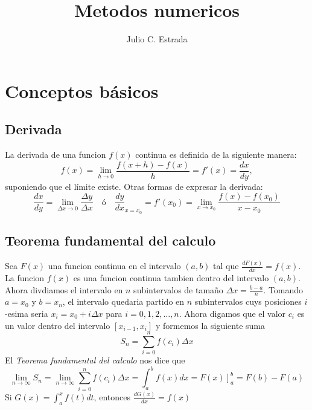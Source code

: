 \documentclass{article}
\title{Metodos numericos}
\author{Julio C. Estrada}
\begin{document}
\maketitle

\section{Conceptos b\'asicos}
\subsection{Derivada}
La derivada de una funcion $f(x)$ continua es definida de la siguiente
manera:
\begin{equation}
  f(x)=\lim_{h\to 0}\frac{f(x+h)-f(x)}{h}=f'(x)=\frac{dx}{dy},
\end{equation}
suponiendo que el l\'imite existe. Otras formas de expresar la
derivada:
\begin{equation}
  \frac{dx}{dy}=\lim_{\Delta x\to 0}\frac{\Delta y}{\Delta x}\quad
  \text{\'o}
  \quad \frac{dy}{dx}_{x=x_0}=f'(x_0)=\lim_{x\to x_0}\frac{f(x)-f(x_0)}{x-x_0}
\end{equation}

\subsection{Teorema fundamental del calculo}
Sea $F(x)$ una funcion continua en el intervalo $(a,b)$ tal que
$\frac{dF(x)}{dx}=f(x)$. La funcion $f(x)$ es una funcion continua
tambien dentro del intervalo $(a,b)$. Ahora divdiamos el intervalo en
$n$ subintervalos de tama\~no $\Delta x=\frac{b-a}{n}$. Tomando
$a=x_0$ y $b=x_n$, el intervalo quedaria partido en $n$ subintervalos
cuys posiciones $i$-esima seria $x_i=x_0+i\Delta x$ para
$i=0,1,2,\dots,n$. Ahora digamos que el valor $c_i$ es un valor dentro
del intervalo $[x_{i-1},x_i]$ y formemos la siguiente suma
\begin{equation}
  S_n=\sum_{i=0}^{n}f(c_i)\Delta x
\end{equation}
El \emph{Teorema fundamental del calculo} nos dice que
\begin{equation}
\lim_{n\to \infty}S_n=\lim_{n\to \infty}\sum_{i=0}^{n}f(c_i)\Delta x =
\int_a^bf(x)dx
= \left. F(x)\right]_a^b=F(b)-F(a)
\end{equation}
Si $G(x)=\int_a^xf(t)dt$, entonces $\frac{dG(x)}{dx}=f(x)$
\end{document}
